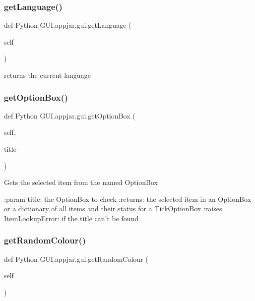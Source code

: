 \subsubsection{\texorpdfstring{get\+Language()}{getLanguage()}}
{\footnotesize\ttfamily def Python G\+U\+I.\+appjar.\+gui.\+get\+Language (\begin{DoxyParamCaption}\item[{}]{self }\end{DoxyParamCaption})}

\begin{DoxyVerb}returns the current language \end{DoxyVerb}
 \mbox{\label{class_python_01_g_u_i_1_1appjar_1_1gui_ac0fd08d8e4dab5b50559b5a20a52dba0}} 
\subsubsection{\texorpdfstring{get\+Option\+Box()}{getOptionBox()}}
{\footnotesize\ttfamily def Python G\+U\+I.\+appjar.\+gui.\+get\+Option\+Box (\begin{DoxyParamCaption}\item[{}]{self,  }\item[{}]{title }\end{DoxyParamCaption})}

\begin{DoxyVerb}Gets the selected item from the named OptionBox

:param title: the OptionBox to check
:returns: the selected item in an OptionBox or a dictionary of all items and their status for a TickOptionBox
:raises ItemLookupError: if the title can't be found
\end{DoxyVerb}
 \mbox{\label{class_python_01_g_u_i_1_1appjar_1_1gui_a1a5a0b997cbd14cbf4a6f30f394fae80}} 
\subsubsection{\texorpdfstring{get\+Random\+Colour()}{getRandomColour()}}
{\footnotesize\ttfamily def Python G\+U\+I.\+appjar.\+gui.\+get\+Random\+Colour (\begin{DoxyParamCaption}\item[{}]{self }\end{DoxyParamCaption})}

